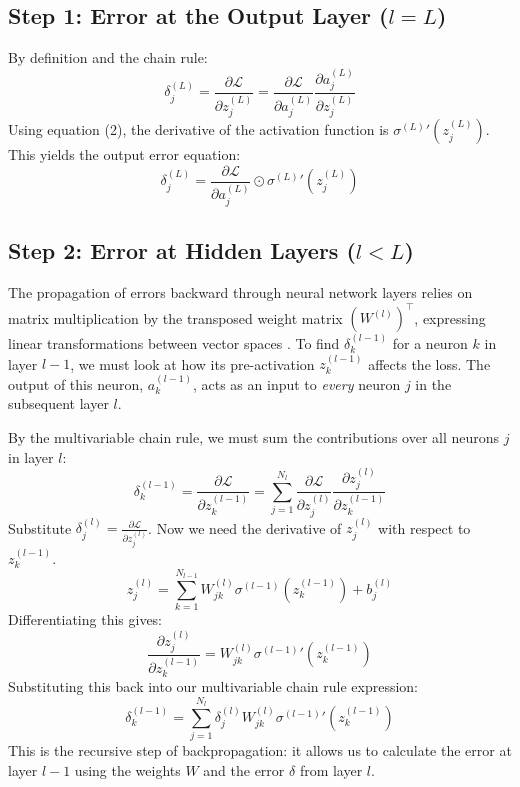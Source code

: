 \documentclass[11pt,a4paper]{article}
\begin{document}
\subsection{Step 1: Error at the Output Layer ($l=L$)}
By definition and the chain rule:
\begin{equation}
	\delta_j^{(L)} = \frac{\partial \mathcal{L}}{\partial z_j^{(L)}} = \frac{\partial \mathcal{L}}{\partial a_j^{(L)}} \frac{\partial a_j^{(L)}}{\partial z_j^{(L)}}
\end{equation}
Using equation (2), the derivative of the activation function is ${\sigma^{(L)}}'(z_j^{(L)})$. This yields the output error equation:
\begin{equation}
	\delta_j^{(L)} = \frac{\partial \mathcal{L}}{\partial a_j^{(L)}} \odot {\sigma^{(L)}}'(z_j^{(L)})
\end{equation}

\subsection{Step 2: Error at Hidden Layers ($l < L$)}
The propagation of errors backward through neural network layers relies on matrix multiplication by the transposed weight matrix $(W^{(l)})^\top$, expressing linear transformations between vector spaces \parencite{strang2012linear}.
To find $\delta_k^{(l-1)}$ for a neuron $k$ in layer $l-1$, we must look at how its pre-activation $z_k^{(l-1)}$ affects the loss. The output of this neuron, $a_k^{(l-1)}$, acts as an input to \textit{every} neuron $j$ in the subsequent layer $l$. 

By the multivariable chain rule, we must sum the contributions over all neurons $j$ in layer $l$:
\begin{equation}
	\delta_k^{(l-1)} = \frac{\partial \mathcal{L}}{\partial z_k^{(l-1)}} = \sum_{j=1}^{N_l} \frac{\partial \mathcal{L}}{\partial z_j^{(l)}} \frac{\partial z_j^{(l)}}{\partial z_k^{(l-1)}}
\end{equation}
Substitute $\delta_j^{(l)} = \frac{\partial \mathcal{L}}{\partial z_j^{(l)}}$. Now we need the derivative of $z_j^{(l)}$ with respect to $z_k^{(l-1)}$. 
\begin{equation}
	z_j^{(l)} = \sum_{k=1}^{N_{l-1}} W_{jk}^{(l)} \sigma^{(l-1)}(z_k^{(l-1)}) + b_j^{(l)}
\end{equation}
Differentiating this gives:
\begin{equation}
	\frac{\partial z_j^{(l)}}{\partial z_k^{(l-1)}} = W_{jk}^{(l)} {\sigma^{(l-1)}}'(z_k^{(l-1)})
\end{equation}
Substituting this back into our multivariable chain rule expression:
\begin{equation}
	\delta_k^{(l-1)} = \sum_{j=1}^{N_l} \delta_j^{(l)} W_{jk}^{(l)} {\sigma^{(l-1)}}'(z_k^{(l-1)})
\end{equation}
This is the recursive step of backpropagation: it allows us to calculate the error at layer $l-1$ using the weights $W$ and the error $\delta$ from layer $l$.
\end{document}
